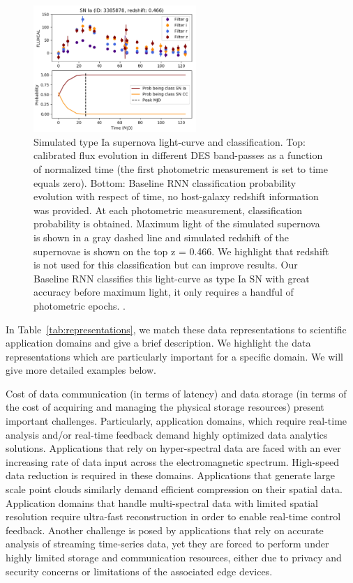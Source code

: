  \begin{figure}[tbh!]
     \centering
     \includegraphics[width = 0.55\textwidth]{figures/supernova_classification.png}
     \caption{Simulated type Ia supernova light-curve and classification. Top: calibrated flux evolution in different DES band-passes as a function of normalized time (the first photometric measurement is set to time equals zero). Bottom: Baseline RNN classification probability evolution with respect of time, no host-galaxy redshift information was provided. At each photometric measurement, classification probability is obtained. Maximum light of the simulated supernova is shown in a gray dashed line and simulated redshift of the supernovae is shown on the top z = 0.466. We highlight that redshift is not used for this classification but can improve results. Our Baseline RNN classifies this light-curve as type Ia SN with great accuracy before maximum light, it only requires a handful of photometric epochs. \cite{supernova_2019}.}
     \label{fig:supernova}
 \end{figure}
 
In Table~\ref{tab:representations}, we match these data representations to scientific application domains and give a brief description.  We highlight the data representations which are particularly important for a specific domain.  We will give more detailed examples below.  


Cost of data communication (in terms of latency) and data storage (in terms of the cost of acquiring and managing the physical storage resources) present important challenges. Particularly, application domains, which require real-time analysis and/or real-time feedback demand highly optimized data analytics solutions. Applications that rely on hyper-spectral data are faced with an ever increasing rate of data input across the electromagnetic spectrum. High-speed data reduction is required in these domains. Applications that generate large scale point clouds similarly demand efficient compression on their spatial data. Application domains that handle multi-spectral data with limited spatial resolution require ultra-fast reconstruction in order to enable real-time control feedback. Another challenge is posed by applications that rely on accurate analysis of streaming time-series data, yet they are forced to perform under highly limited storage and communication resources, either due to privacy and security concerns or limitations of the associated edge devices.  

